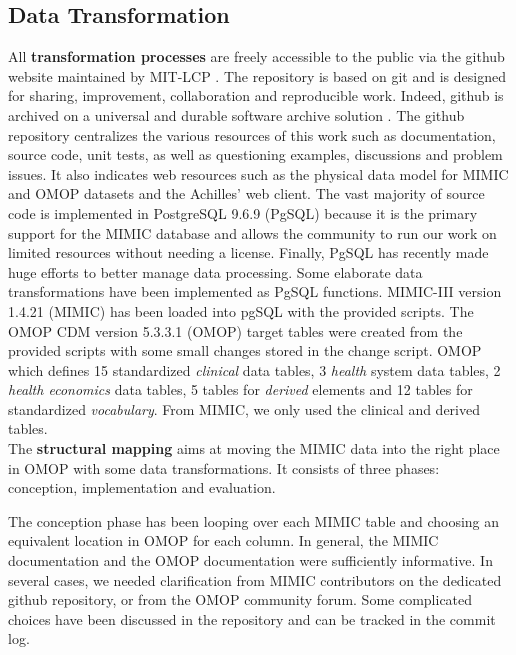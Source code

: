 %
%
\subsection{Data Transformation}

%

All \textbf{transformation processes} are freely accessible to the public via
the github website \cite{mimic-omop-website} maintained by MIT-LCP
\cite{mimic-nature}. The repository is based on git and is designed for
sharing, improvement, collaboration and reproducible work. Indeed, github is
archived on a universal and durable software archive solution
\cite{universal-archive}. The github repository centralizes the various
resources of this work such as documentation, source code, unit tests, as well
as questioning examples, discussions and problem issues.  It also indicates web
resources such as the physical data model for MIMIC \cite{mimic-schemaspy} and
OMOP\cite{omop-schemaspy} datasets and the Achilles' web
client\cite{mimic-omop-achilles}.
The vast majority of source code is implemented in PostgreSQL 9.6.9 (PgSQL) 
because it is the primary support for the MIMIC database and allows the community 
to run our work on limited resources without needing a license. 
Finally, PgSQL has recently made huge efforts to better manage data processing. 
Some elaborate data transformations have been implemented as PgSQL functions.
MIMIC-III version 1.4.21 (MIMIC) has been loaded into pgSQL with the provided
scripts. The OMOP CDM version 5.3.3.1 (OMOP) target tables were created from
the provided scripts with some small changes stored in the change script. OMOP
which defines 15 standardized \textit{clinical} data tables, 3 \textit{health}
system data tables, 2 \textit{health economics} data tables, 5 tables for
\textit{derived} elements and 12 tables for standardized \textit{vocabulary}.
From MIMIC, we only used the clinical and derived tables. 
\\

The \textbf{structural mapping} aims at moving the MIMIC data into the right
place in OMOP with some data transformations. It consists of three
phases: conception, implementation and evaluation.

The conception phase has been looping over each MIMIC table and choosing an
equivalent location in OMOP for each column. In general, the MIMIC
documentation and the OMOP documentation were sufficiently informative. In
several cases, we needed clarification from MIMIC contributors on the dedicated
github repository, or from the OMOP community forum. Some complicated choices
have been discussed in the repository \cite{mimic-omop-github} and can be
tracked in the commit log.

